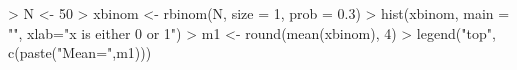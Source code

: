 \begin{Schunk}
\begin{Sinput}
> N <- 50
> xbinom <- rbinom(N, size = 1, prob = 0.3)
> hist(xbinom, main = "", xlab="x is either 0 or 1")
> m1 <- round(mean(xbinom), 4)
> legend("top", c(paste("Mean=",m1)))
\end{Sinput}
\end{Schunk}
